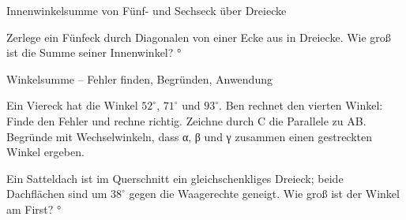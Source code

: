 \begin{aufgabe}{Innenwinkelsumme von Fünf- und Sechseck über Dreiecke}
\begin{teile}
\teil Zerlege ein Fünfeck durch Diagonalen von einer Ecke aus in Dreiecke. Wie groß ist die Summe seiner Innenwinkel? \leerfeld °
\end{teile}
\end{aufgabe}

\begin{aufgabe}{Winkelsumme – Fehler finden, Begründen, Anwendung}
\begin{teile}
\teil Ein Viereck hat die Winkel $52^\circ$, $71^\circ$ und $93^\circ$. Ben rechnet den vierten Winkel:  Finde den Fehler und rechne richtig.
\teil Zeichne durch C die Parallele zu AB. Begründe mit Wechselwinkeln, dass α, β und γ zusammen einen gestreckten Winkel ergeben.

\teil Ein Satteldach ist im Querschnitt ein gleichschenkliges Dreieck; beide Dachflächen sind um $38^\circ$ gegen die Waagerechte geneigt. Wie groß ist der Winkel am First? \leerfeld °
\end{teile}
\end{aufgabe}
